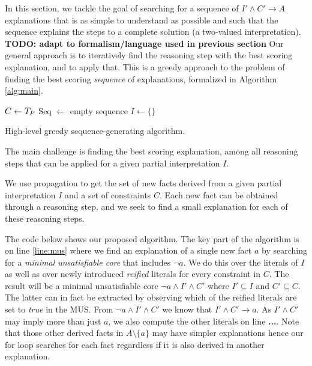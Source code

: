 In this section, we tackle the goal of searching for a sequence of $I' \wedge C' \rightarrow A$ explanations that is as simple to understand as possible and such that the sequence explains the steps to a complete solution (a two-valued interpretation). \textbf{TODO: adapt to formalism/language used in previous section} 
% 
 
% 
Our general approach is to iteratively find the reasoning step with the best scoring explanation, and to apply that. This is a greedy approach to the problem of finding the best scoring \textit{sequence} of explanations, formalized in Algorithm \ref{alg:main}.

\begin{algorithm}
$C \gets T_P$\;
Seq $\gets$ empty sequence\;
$I \gets \{\}$\;
\caption{High-level greedy sequence-generating algorithm.}
\label{alg:main}
\end{algorithm}

The main challenge is finding the best scoring explanation, among all reasoning steps that can be applied for a given partial interpretation $I$.

We use propagation to get the set of new facts derived from a given partial interpretation $I$ and a set of constraints $C$. Each new fact can be obtained through a reasoning step, and we seek to find a small explanation for each of these reasoning steps.


The code below shows our proposed algorithm. The key part of the algorithm is on line \ref{line:mus} where we find an explanation of a single new fact $a$ by searching for a \textit{minimal unsatisfiable core} that includes $\neg a$. We do this over the literals of $I$ as well as over newly introduced \textit{reified} literals for every constraint in $C$. The result will be a minimal unsatisfiable core $\neg a \wedge I' \wedge C'$ where $I' \subseteq I$ and $C' \subseteq C$. The latter can in fact be extracted by observing which of the reified literals are set to \textit{true} in the MUS. From $\neg a \wedge I' \wedge C'$ we know that $I' \wedge C' \rightarrow a$. As $I' \wedge C'$ may imply more than just $a$, we also compute the other literals on line \textbf{...}. Note that those other derived facts in $A \setminus \{a\}$ may have simpler explanations hence our for loop searches for each fact regardless if it is also derived in another explanation.


